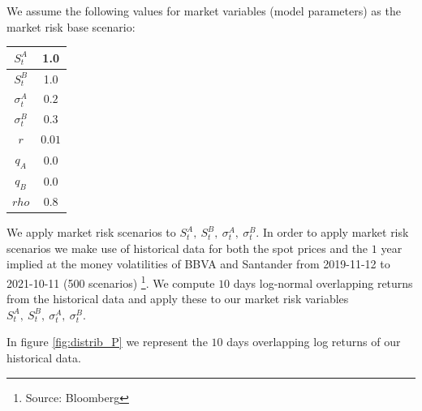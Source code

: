 We assume the following values for market variables (model parameters) as the market risk base scenario:

\begin{center}
\begin{tabular}{||c | c||} 
 \hline
 $S_t^A$ & 1.0 \\
 \hline
 $S_t^B$ & 1.0 \\
 \hline
 $\sigma_t^A$ & $0.2$ \\
 \hline
 $\sigma_t^B$ & $0.3$ \\
 \hline
 $r$ & $0.01$ \\
 \hline
 $q_A$ & $0.0$ \\
 \hline
 $q_B$ & $0.0$ \\
 \hline
 $rho$ & $0.8$ \\
 \hline
\end{tabular}
\end{center}

We apply market risk scenarios to $S_t^A,\ S_t^B,\ \sigma_t^A,\ \sigma_t^B$.
In order to apply market risk scenarios we make use of historical data for both the spot prices and the $1$ year implied at the money volatilities of BBVA and Santander from 2019-11-12 to 2021-10-11 (500 scenarios) \footnote{Source: Bloomberg}. We compute $10$ days log-normal overlapping returns from the historical data and apply these to our market risk variables $S_t^A,\ S_t^B,\ \sigma_t^A,\ \sigma_t^B$.


In figure \ref{fig:distrib_P} we represent the $10$ days overlapping log returns of our historical data.

